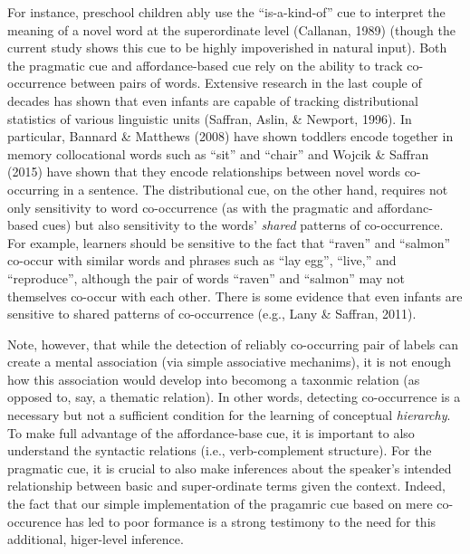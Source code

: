 \documentclass[english,,man]{apa6}
\begin{document}
For instance, preschool children ably use the \enquote{is-a-kind-of} cue to interpret the meaning of a novel word at the superordinate level (Callanan, 1989) (though the current study shows this cue to be highly impoverished in natural input). Both the pragmatic cue and affordance-based cue rely on the ability to track co-occurrence between pairs of words. Extensive research in the last couple of decades has shown that even infants are capable of tracking distributional statistics of various linguistic units (Saffran, Aslin, \& Newport, 1996). In particular, Bannard \& Matthews (2008) have shown toddlers encode together in memory collocational words such as \enquote{sit} and \enquote{chair} and Wojcik \& Saffran (2015) have shown that they encode relationships between novel words co-occurring in a sentence. The distributional cue, on the other hand, requires not only sensitivity to word co-occurrence (as with the pragmatic and affordanc-based cues) but also sensitivity to the words' \emph{shared} patterns of co-occurrence. For example, learners should be sensitive to the fact that \enquote{raven} and \enquote{salmon} co-occur with similar words and phrases such as \enquote{lay egg}, \enquote{live,} and \enquote{reproduce}, although the pair of words \enquote{raven} and \enquote{salmon} may not themselves co-occur with each other. There is some evidence that even infants are sensitive to shared patterns of co-occurrence (e.g., Lany \& Saffran, 2011).

Note, however, that while the detection of reliably co-occurring pair of labels can create a mental association (via simple associative mechanims), it is not enough how this association would develop into becomong a taxonmic relation (as opposed to, say, a thematic relation). In other words, detecting co-occurrence is a necessary but not a sufficient condition for the learning of conceptual \emph{hierarchy}. To make full advantage of the affordance-base cue, it is important to also understand the syntactic relations (i.e., verb-complement structure). For the pragmatic cue, it is crucial to also make inferences about the speaker's intended relationship between basic and super-ordinate terms given the context. Indeed, the fact that our simple implementation of the pragamric cue based on mere co-occurence has led to poor formance is a strong testimony to the need for this additional, higer-level inference.
\end{document}
